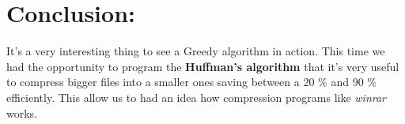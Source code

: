 \section{Conclusion:}

It's a very interesting thing to see a Greedy algorithm in action. This time we had the opportunity to program the {\bfseries Huffman's algorithm} that it's very useful to compress bigger files into a smaller ones saving between a 20 $\%$ and 90 $\%$ efficiently. This allow us to had an idea how compression programs like {\itshape winrar} works.

\pagebreak